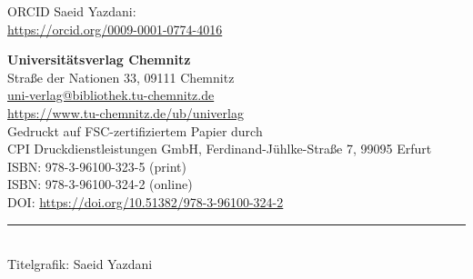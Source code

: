 \documentclass[a5paper,9pt,twoside,headings=openright]{scrbook}
\begin{document}
\begin{small}
        ORCID Saeid Yazdani:\\
        \url{https://orcid.org/0009-0001-0774-4016}\\

        \vspace*{2mm}

        \textbf{Universitätsverlag Chemnitz}\\
        Straße der Nationen 33, 09111 Chemnitz\\
        \href{mailto:uni-verlag@bibliothek.tu-chemnitz.de}{uni-verlag@bibliothek.tu-chemnitz.de}\\
        \url{https://www.tu-chemnitz.de/ub/univerlag}\\

        Gedruckt auf FSC-zertifiziertem Papier durch\\
        CPI Druckdienstleistungen GmbH, Ferdinand-Jühlke-Straße 7, 99095 Erfurt\\

        ISBN: 978-3-96100-323-5 (print)\\
        ISBN: 978-3-96100-324-2 (online)\\
        DOI: \url{https://doi.org/10.51382/978-3-96100-324-2}\\

        \hrule \mbox{}\\
        Titelgrafik: Saeid Yazdani

    \end{small}

    \newpage
    \endgroup
\end{document}
